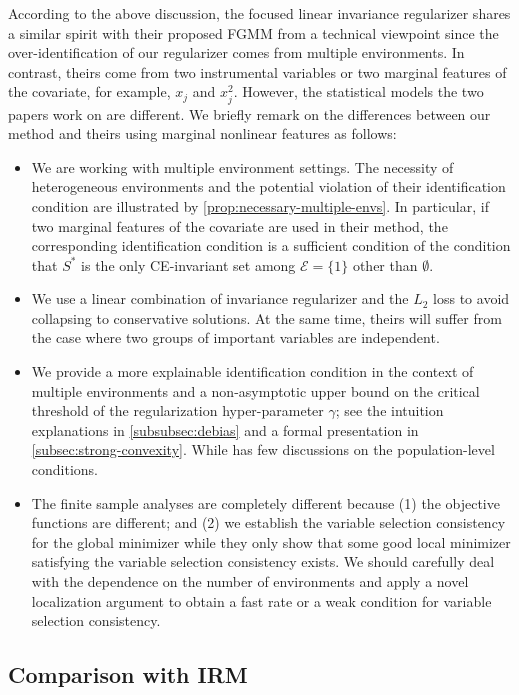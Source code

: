 \documentclass[10pt]{article}
\numberwithin{equation}{section}
\begin{document}
According to the above discussion, the focused linear invariance regularizer shares a similar spirit with their proposed FGMM from a technical viewpoint since the over-identification of our regularizer comes from multiple environments. In contrast, theirs come from two instrumental variables or two marginal features of the covariate, for example, $x_j$ and $x_j^2$. However, the statistical models the two papers work on are different. We briefly remark on the differences between our method and theirs using marginal nonlinear features as follows:
\begin{itemize}
    \item[1.] We are working with multiple environment settings. The necessity of heterogeneous environments and the potential violation of their identification condition are illustrated by \cref{prop:necessary-multiple-envs}. In particular, if two marginal features of the covariate are used in their method, the corresponding identification condition is a sufficient condition of the condition that $S^*$ is the only CE-invariant set among $\mathcal{E}=\{1\}$ other than $\emptyset$.
    \item[2.] We use a linear combination of invariance regularizer and the $L_2$ loss to avoid collapsing to conservative solutions. At the same time, theirs will suffer from the case where two groups of important variables are independent.
    \item[3.] We provide a more explainable identification condition in the context of multiple environments and a non-asymptotic upper bound on the critical threshold of the regularization hyper-parameter $\gamma$; see the intuition explanations in \cref{subsubsec:debias} and a formal presentation in \cref{subsec:strong-convexity}. While \cite{fan2014endogeneity} has few discussions on the population-level conditions.
    \item[4.] The finite sample analyses are completely different because (1) the objective functions are different; and (2) we establish the variable selection consistency for the global minimizer while they only show that some good local minimizer satisfying the variable selection consistency exists. We should carefully deal with the dependence on the number of environments and apply a novel localization argument to obtain a fast rate or a weak condition for variable selection consistency. 
\end{itemize}

\subsection{Comparison with IRM}
\label{sec:irm}
\end{document}
